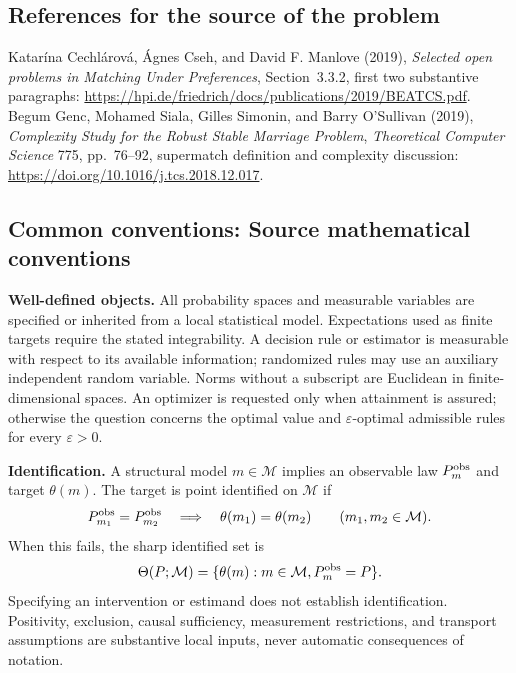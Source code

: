 \documentclass[11pt,a4paper]{article}
\begin{document}
\subsection*{References for the source of the problem}
Katar\'ina Cechl\'arov\'a, \'Agnes Cseh, and David F. Manlove (2019), \emph{Selected open problems in Matching Under Preferences}, Section~3.3.2, first two substantive paragraphs: \url{https://hpi.de/friedrich/docs/publications/2019/BEATCS.pdf}. Begum Genc, Mohamed Siala, Gilles Simonin, and Barry O'Sullivan (2019), \emph{Complexity Study for the Robust Stable Marriage Problem}, \emph{Theoretical Computer Science} 775, pp.~76--92, supermatch definition and complexity discussion: \url{https://doi.org/10.1016/j.tcs.2018.12.017}.

\subsection*{Common conventions: Source mathematical conventions}

\textbf{Well-defined objects.}
All probability spaces and measurable variables are specified or inherited
from a local statistical model. Expectations used as finite targets require
the stated integrability. A decision rule or estimator is measurable with
respect to its available information; randomized rules may use an auxiliary
independent random variable. Norms without a subscript are Euclidean in
finite-dimensional spaces. An optimizer is requested only when attainment
is assured; otherwise the question concerns the optimal value and
$\varepsilon$-optimal admissible rules for every $\varepsilon>0$.

\textbf{Identification.}
A structural model $m\in\mathcal M$ implies an observable law
$P_m^{\rm obs}$ and target $\theta(m)$. The target is point identified on
$\mathcal M$ if
\[
 P_{m_1}^{\rm obs}=P_{m_2}^{\rm obs}
 \quad\Longrightarrow\quad\theta(m_1)=\theta(m_2)
 \qquad(m_1,m_2\in\mathcal M).
\]
When this fails, the sharp identified set is
\[
 \Theta(P;\mathcal M)=\{\theta(m):m\in\mathcal M,
                                  P_m^{\rm obs}=P\}.
\]
Specifying an intervention or estimand does not establish identification.
Positivity, exclusion, causal sufficiency, measurement restrictions, and
transport assumptions are substantive local inputs, never automatic
consequences of notation.
\end{document}
